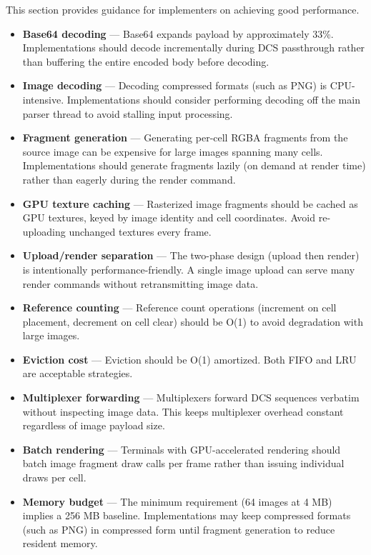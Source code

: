 \documentclass[a4paper]{article}
\begin{document}
This section provides guidance for implementers on achieving good performance.

\begin{itemize}
    \item \textbf{Base64 decoding} ---
        Base64 expands payload by approximately 33\%.
        Implementations should decode incrementally during DCS passthrough
        rather than buffering the entire encoded body before decoding.

    \item \textbf{Image decoding} ---
        Decoding compressed formats (such as PNG) is CPU-intensive.
        Implementations should consider performing decoding off the main parser thread
        to avoid stalling input processing.

    \item \textbf{Fragment generation} ---
        Generating per-cell RGBA fragments from the source image can be expensive
        for large images spanning many cells.
        Implementations should generate fragments lazily (on demand at render time)
        rather than eagerly during the render command.

    \item \textbf{GPU texture caching} ---
        Rasterized image fragments should be cached as GPU textures,
        keyed by image identity and cell coordinates.
        Avoid re-uploading unchanged textures every frame.

    \item \textbf{Upload/render separation} ---
        The two-phase design (upload then render) is intentionally performance-friendly.
        A single image upload can serve many render commands
        without retransmitting image data.

    \item \textbf{Reference counting} ---
        Reference count operations (increment on cell placement, decrement on cell clear)
        should be O(1) to avoid degradation with large images.

    \item \textbf{Eviction cost} ---
        Eviction should be O(1) amortized.
        Both FIFO and LRU are acceptable strategies.

    \item \textbf{Multiplexer forwarding} ---
        Multiplexers forward DCS sequences verbatim without inspecting image data.
        This keeps multiplexer overhead constant regardless of image payload size.

    \item \textbf{Batch rendering} ---
        Terminals with GPU-accelerated rendering should batch image fragment draw calls
        per frame rather than issuing individual draws per cell.

    \item \textbf{Memory budget} ---
        The minimum requirement (64 images at 4 MB) implies a 256 MB baseline.
        Implementations may keep compressed formats (such as PNG) in compressed form
        until fragment generation to reduce resident memory.
\end{itemize}
\end{document}
